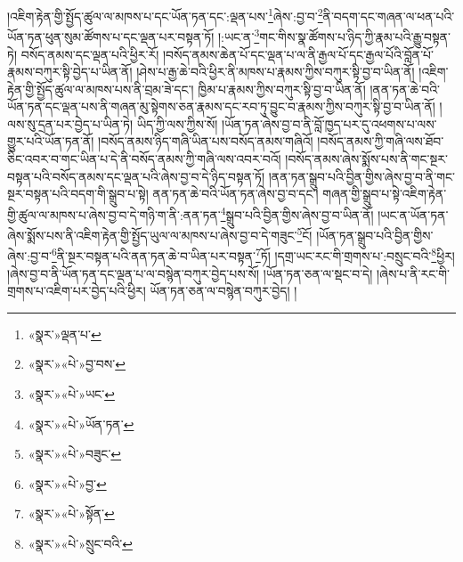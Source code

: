 །འཇིག་རྟེན་གྱི་སྤྱོད་ཚུལ་ལ་མཁས་པ་དང་ཡོན་ཏན་དང་:ལྡན་པས་\footnote{«སྣར་»ལྡན་པ་}ཞེས་:བྱ་བ་\footnote{«སྣར་»«པེ་»བྱ་བས་}ནི་བདག་དང་གཞན་ལ་ཕན་པའི་ཡོན་ཏན་ཕུན་སུམ་ཚོགས་པ་དང་ལྡན་པར་བསྟན་ཏོ། །:ཡང་ན་\footnote{«སྣར་»«པེ་»ཡང་}གང་གིས་སྣ་ཚོགས་པ་ཉིད་ཀྱི་རྣམ་པའི་རྒྱུ་བསྟན་ཏེ། བསོད་ནམས་དང་ལྡན་པའི་ཕྱིར་རོ། །བསོད་ནམས་ཆེན་པོ་དང་ལྡན་པ་ལ་ནི་རྒྱལ་པོ་དང་རྒྱལ་པོའི་བློན་པོ་རྣམས་བཀུར་སྟི་བྱེད་པ་ཡིན་ནོ། །ཤེས་པ་རྒྱ་ཆེ་བའི་ཕྱིར་ནི་མཁས་པ་རྣམས་ཀྱིས་བཀུར་སྟི་བྱ་བ་ཡིན་ནོ། །འཇིག་རྟེན་གྱི་སྤྱོད་ཚུལ་ལ་མཁས་པས་ནི་བྲམ་ཟེ་དང་། ཁྱིམ་པ་རྣམས་ཀྱིས་བཀུར་སྟི་བྱ་བ་ཡིན་ནོ། །ནན་ཏན་ཆེ་བའི་ཡོན་ཏན་དང་ལྡན་པས་ནི་གཞན་མུ་སྟེགས་ཅན་རྣམས་དང་རབ་ཏུ་བྱུང་བ་རྣམས་ཀྱིས་བཀུར་སྟི་བྱ་བ་ཡིན་ནོ། །ལས་སུ་དྲན་པར་བྱེད་པ་ཡིན་ཏེ། ཡིད་ཀྱི་ལས་ཀྱིས་སོ། །ཡོན་ཏན་ཞེས་བྱ་བ་ནི་བློ་ཁྱད་པར་དུ་འཕགས་པ་ལས་གྱུར་པའི་ཡོན་ཏན་ནོ། །བསོད་ནམས་ཉིད་གཞི་ཡིན་པས་བསོད་ནམས་གཞིའོ། །བསོད་ནམས་ཀྱི་གཞི་ལས་ཐོབ་ཅིང་འབར་བ་གང་ཡིན་པ་དེ་ནི་བསོད་ནམས་ཀྱི་གཞི་ལས་འབར་བའོ། །བསོད་ནམས་ཞེས་སྨོས་པས་ནི་གང་སྔར་བསྟན་པའི་བསོད་ནམས་དང་ལྡན་པའི་ཞེས་བྱ་བ་དེ་ཉིད་བསྟན་ཏོ། །ནན་ཏན་སྒྲུབ་པའི་བྱིན་གྱིས་ཞེས་བྱ་བ་ནི་གང་སྔར་བསྟན་པའི་བདག་གི་སྒྲུབ་པ་སྟེ། ནན་ཏན་ཆེ་བའི་ཡོན་ཏན་ཞེས་བྱ་བ་དང་། གཞན་གྱི་སྒྲུབ་པ་སྟེ་འཇིག་རྟེན་གྱི་ཚུལ་ལ་མཁས་པ་ཞེས་བྱ་བ་དེ་གཉི་ག་ནི་:ནན་ཏན་\footnote{«སྣར་»«པེ་»ཡོན་ཏན་}སྒྲུབ་པའི་བྱིན་གྱིས་ཞེས་བྱ་བ་ཡིན་ནོ། །ཡང་ན་ཡོན་ཏན་ཞེས་སྨོས་པས་ནི་འཇིག་རྟེན་གྱི་སྤྱོད་ཡུལ་ལ་མཁས་པ་ཞེས་བྱ་བ་དེ་གཟུང་\footnote{«སྣར་»«པེ་»བཟུང་}ངོ། །ཡོན་ཏན་སྒྲུབ་པའི་བྱིན་གྱིས་ཞེས་:བྱ་བ་\footnote{«སྣར་»«པེ་»བྱ་}ནི་སྔར་བསྟན་པའི་ནན་ཏན་ཆེ་བ་ཡིན་པར་བསྟན་\footnote{«སྣར་»«པེ་»སྟོན་}ཏོ། །དགྲ་ཡང་རང་གི་གྲགས་པ་:བསྲུང་བའི་\footnote{«སྣར་»«པེ་»སྲུང་བའི་}ཕྱིར། །ཞེས་བྱ་བ་ནི་ཡོན་ཏན་དང་ལྡན་པ་ལ་བསྙེན་བཀུར་བྱེད་པས་སོ། །ཡོན་ཏན་ཅན་ལ་སྡང་བ་དེ། །ཞེས་པ་ནི་རང་གི་གྲགས་པ་འཇིག་པར་བྱེད་པའི་ཕྱིར། ཡོན་ཏན་ཅན་ལ་བསྙེན་བཀུར་བྱེད། །

